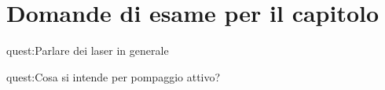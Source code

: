 \clearpage 
\section*{Domande di esame per il capitolo}%
\begin{quest}{quest:Parlare dei laser in generale}
\end{quest}
\begin{quest}{quest:Cosa si intende per pompaggio attivo?}
\end{quest}


